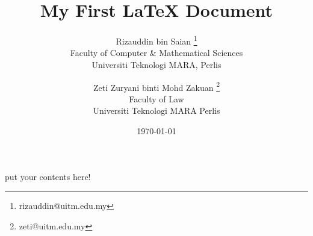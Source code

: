 \documentclass{article}
\title{My First \LaTeX{} Document}
\author{
Rizauddin bin Saian \thanks{rizauddin@uitm.edu.my} \\
Faculty of Computer \& Mathematical Sciences \\
Universiti Teknologi MARA, Perlis
\and
Zeti Zuryani binti Mohd Zakuan \thanks{zeti@uitm.edu.my} \\
Faculty of Law \\
Universiti Teknologi MARA Perlis
}
\date{\today}
\begin{document}
\maketitle

put your contents here!
\end{document}
